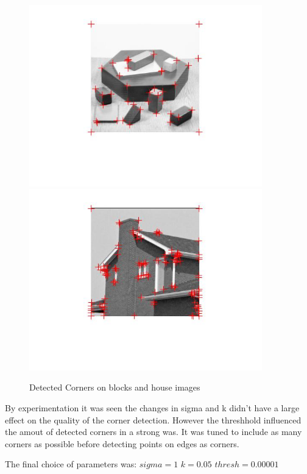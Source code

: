 \documentclass[12pt]{article}
\begin{document}
\begin{figure}[ht]
	\centering
	\includegraphics[width=0.9\textwidth]{corners_blocks.jpg}
	\includegraphics[width=0.9\textwidth]{corners_house.jpg}
	\caption{Detected Corners on blocks and house images}
	\label{fig1}
\end{figure}
\vspace{5mm}
\newline
By experimentation it was seen the changes in sigma and k didn't have a large effect on the quality of the corner detection. However the threshhold influenced the amout of detected corners in a strong was. It was tuned to include as many corners as possible before detecting points on edges as corners. 

The final choice of parameters was: 
$sigma =    1$
\vspace{5mm}
\newline
$k =    0.05$
\vspace{5mm}
\newline
$thresh = 0.00001$
\end{document}
